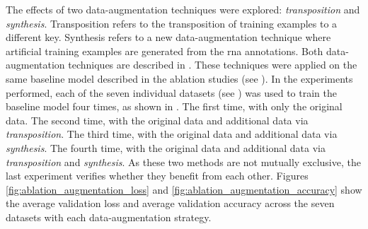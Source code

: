 
The effects of two data-augmentation techniques were
explored: \emph{transposition} and \emph{synthesis}.
Transposition refers to the transposition of training
examples to a different key. Synthesis refers to a new
data-augmentation technique where artificial training
examples are generated from the \gls{rna} annotations. Both
data-augmentation techniques are described in
. These techniques were applied on
the same baseline model described in the ablation studies
(see ). In the experiments
performed, each of the seven individual datasets (see
) was used to train the
baseline model four times, as shown in
. The first time, with only
the original data. The second time, with the original data
and additional data via \emph{transposition}. The third
time, with the original data and additional data via
\emph{synthesis}. The fourth time, with the original data
and additional data via \emph{transposition} and
\emph{synthesis}. As these two methods are not mutually
exclusive, the last experiment verifies whether they benefit
from each other. Figures
\ref{fig:ablation_augmentation_loss} and
\ref{fig:ablation_augmentation_accuracy} show the average
validation loss and average validation accuracy across the
seven datasets with each data-augmentation strategy.



